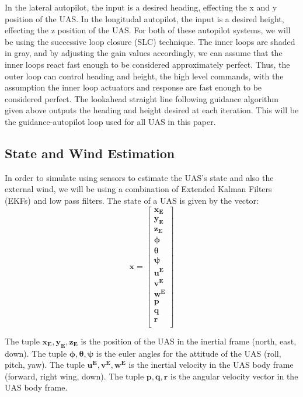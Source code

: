 In the lateral autopilot, the input is a desired heading, effecting the x and y position of the UAS.
In the longitudal autopilot, the input is a desired height, effecting the z position of the UAS.
For both of these autopilot systems, we will be using the successive loop closure (SLC) technique. 
The inner loops are shaded in gray, and by adjusting the gain values accordingly, we can assume that the inner loops react fast enough to be considered approximately perfect.
Thus, the outer loop can control heading and height, the high level commands, with the assumption the inner loop actuators and response are fast enough to be considered perfect.
The lookahead straight line following guidance algorithm given above outputs the heading and height desired at each iteration. 
This will be the guidance-autopilot loop used for all UAS in this paper.

\subsection{State and Wind Estimation}

In order to simulate using sensors to estimate the UAS's state and also the external wind, we will be using a combination of Extended Kalman Filters (EKFs) and low pass filters.
The state of a UAS is given by the vector:
\begin{equation}
    \mathbf{x} = \begin{bmatrix}
        \mathbf{x_E} \\
        \mathbf{y_E} \\
        \mathbf{z_E} \\
        \mathbf{\phi} \\
        \mathbf{\theta} \\
        \mathbf{\psi} \\
        \mathbf{u^{E}} \\
        \mathbf{v^{E}} \\
        \mathbf{w^{E}} \\
        \mathbf{p} \\
        \mathbf{q} \\
        \mathbf{r}\\
    \end{bmatrix}
\end{equation}

The tuple $\mathbf{x_E}, \mathbf{y_E}, \mathbf{z_E}$ is the position of the UAS in the inertial frame (north, east, down).
The tuple $\mathbf{\phi}, \mathbf{\theta}, \mathbf{\psi}$ is the euler angles for the attitude of the UAS (roll, pitch, yaw).
The tuple $\mathbf{u^{E}}, \mathbf{v^{E}}, \mathbf{w^{E}}$ is the inertial velocity in the UAS body frame (forward, right wing, down).
The tuple $\mathbf{p}, \mathbf{q}, \mathbf{r}$ is the angular velocity vector in the UAS body frame.

